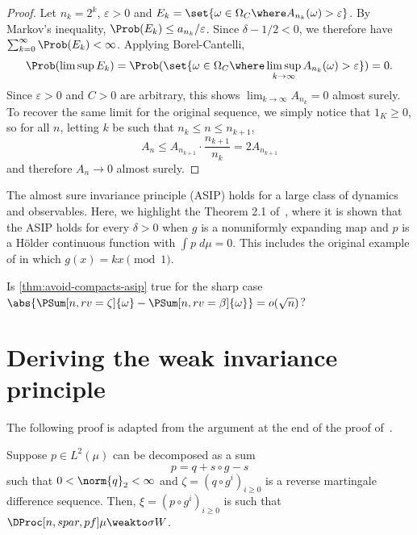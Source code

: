 \documentclass[../main]{subfiles}
\begin{document}
\begin{proof}
  Let \(n_k = 2^k\), \(\varepsilon > 0\) and \(E_k = \set{\omega \in \Omega_C \where A_{n_k}(\omega) > \varepsilon}\). By Markov's inequality, \(\Prob(E_k) \le a_{n_k}/\varepsilon\).
  Since \(\delta - 1/2 < 0\), we therefore have \(\sum_{k = 0}^{\infty} \Prob(E_k) < \infty\). Applying Borel-Cantelli, \[\Prob(\limsup E_k) = \Prob(\set{\omega \in \Omega_C\where \limsup_{k \to \infty} A_{n_k}(\omega) > \varepsilon}) = 0.\]
  Since \(\varepsilon > 0\) and \(C > 0\) are arbitrary, this shows \(\lim_{k \to \infty} A_{n_k} = 0\) almost surely. To recover the same limit for the original sequence, we simply notice that \(1_K \ge 0\), so for all \(n\), letting \(k\) be such that \(n_k \le n \le n_{k + 1}\),
  \begin{equation*}
    A_n \le A_{n_{k + 1}} \cdot \frac{n_{k + 1}}{n_k} = 2 A_{n_{k + 1}}
  \end{equation*}
  and therefore \(A_n \to 0\) almost surely.
\end{proof}

  The almost sure invariance principle (ASIP) holds for a large class of dynamics and observables. Here, we highlight the Theorem 2.1 of~\cite{korepanovRatesAlmostSure2018}, where it is shown that the ASIP holds for every \(\delta > 0\) when \(g\) is a nonuniformly expanding map and \(p\) is a Hölder continuous function with \(\int p \;d\mu = 0\). This includes the original example of \textcite{bonifantSchwarzianDerivativesCylinder2008} in which \(g(x) = kx \pmod 1\).

\begin{question}
  Is \cref{thm:avoid-compacts-asip} true for the sharp case \(\abs{\PSum[n,rv = \zeta]{\omega} - \PSum[n,rv = \beta]{\omega}} = o(\sqrt{n})\)?
\end{question}
  
\section{Deriving the weak invariance principle}\label{sec:deriv-weak-invar}

The following proof is adapted from the argument at the end of the proof of~\cite[Theorem 19.1]{billingsleyConvergenceProbabilityMeasures1999}.

\begin{theorem}\label{thm:martingale-coboundary}
  Suppose \(p \in L^2(\mu)\) can be decomposed as a sum
  \begin{equation}
    p = q + s \circ g - s
  \end{equation}
  such that \(0 < \norm{q}_2 < \infty\) and \(\zeta = (q \circ g^i)_{i \geq 0}\) is a reverse martingale difference sequence. Then, \(\xi = (p \circ g^i)_{i \ge 0}\) is such that \(\DProc[n,spar,pf]\mu \weakto \sigma W\).
\end{theorem}
\end{document}
